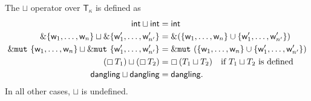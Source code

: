 
\begin{definition}\label{def:lub}
  The $\sqcup$ operator over $\mathsf{T}_\kappa$ is defined as
  \begin{align*}
    \mathsf{int}\sqcup\mathsf{int} &= \mathsf{int}\\
    \&\{\mathsf{w}_1,\ldots,\mathsf{w}_n\} \sqcup \&\{\mathsf{w}'_1,\ldots,\mathsf{w}'_{n'}\} &= \&(\{\mathsf{w}_1,\ldots,\mathsf{w}_n\}\cup\{\mathsf{w}'_1,\ldots,\mathsf{w}'_{n'}\})\\
    \&\mathtt{mut}\ \{\mathsf{w}_1,\ldots,\mathsf{w}_n\} \sqcup \&\mathtt{mut}\ \{\mathsf{w}'_1,\ldots,\mathsf{w}'_{n'}\} &= \&\mathtt{mut}\ (\{\mathsf{w}_1,\ldots,\mathsf{w}_n\}\cup\{\mathsf{w}'_1,\ldots,\mathsf{w}'_{n'}\})\\
    (\boxempty\,{T_1}) \sqcup (\boxempty\,{T_2}) &=\boxempty\,{(T_1\sqcup T_2)}\quad\text{if $T_1\sqcup T_2$ is defined}\\
    \mathsf{dangling}\sqcup\mathsf{dangling} &= \mathsf{dangling}.
  \end{align*}
  In all other cases, $\sqcup$ is undefined.
\end{definition}

